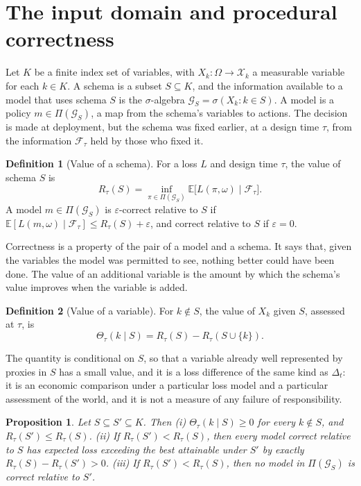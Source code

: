 \documentclass[11pt]{article}
\newcommand{\F}{\mathcal F}
\newcommand{\G}{\mathcal G}
\newcommand{\E}{\mathbb E}
\newcommand{\Th}{\Theta}
\theoremstyle{plain}
\newtheorem{proposition}{Proposition}
\theoremstyle{definition}
\newtheorem{definition}{Definition}
\begin{document}
\section{The input domain and procedural correctness}

Let $K$ be a finite index set of variables, with $X_k:\Omega\to\mathcal X_k$ a measurable variable for each $k\in K$. A schema is a subset $S\subseteq K$, and the information available to a model that uses schema $S$ is the $\sigma$-algebra $\G_S=\sigma(X_k:k\in S)$. A model is a policy $m\in\Pi(\G_S)$, a map from the schema's variables to actions. The decision is made at deployment, but the schema was fixed earlier, at a design time $\tau$, from the information $\F_\tau$ held by those who fixed it.

\begin{definition}[Value of a schema]
For a loss $L$ and design time $\tau$, the value of schema $S$ is
\[
R_\tau(S)=\inf_{\pi\in\Pi(\G_S)}\E\bigl[L(\pi,\omega)\mid\F_\tau\bigr].
\]
A model $m\in\Pi(\G_S)$ is $\varepsilon$-correct relative to $S$ if $\E[L(m,\omega)\mid\F_\tau]\le R_\tau(S)+\varepsilon$, and correct relative to $S$ if $\varepsilon=0$.
\end{definition}

Correctness is a property of the pair of a model and a schema. It says that, given the variables the model was permitted to see, nothing better could have been done. The value of an additional variable is the amount by which the schema's value improves when the variable is added.

\begin{definition}[Value of a variable]
For $k\notin S$, the value of $X_k$ given $S$, assessed at $\tau$, is
\[
\Th_\tau(k\mid S)=R_\tau(S)-R_\tau(S\cup\{k\}).
\]
\end{definition}

The quantity is conditional on $S$, so that a variable already well represented by proxies in $S$ has a small value, and it is a loss difference of the same kind as $\Delta_t$: it is an economic comparison under a particular loss model and a particular assessment of the world, and it is not a measure of any failure of responsibility.

\begin{proposition}\label{prop:correctness}
Let $S\subseteq S'\subseteq K$. Then (i) $\Th_\tau(k\mid S)\ge 0$ for every $k\notin S$, and $R_\tau(S')\le R_\tau(S)$. (ii) If $R_\tau(S')<R_\tau(S)$, then every model correct relative to $S$ has expected loss exceeding the best attainable under $S'$ by exactly $R_\tau(S)-R_\tau(S')>0$. (iii) If $R_\tau(S')<R_\tau(S)$, then no model in $\Pi(\G_S)$ is correct relative to $S'$.
\end{proposition}
\end{document}
